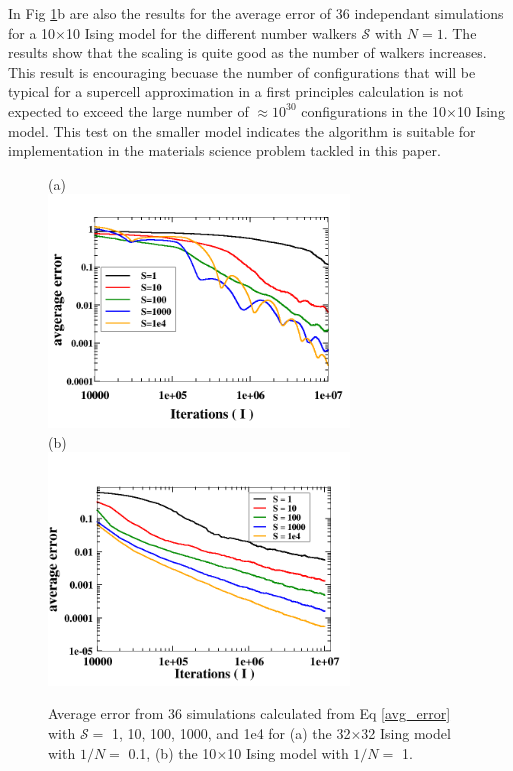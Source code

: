 \documentclass[aps,prl,reprint,superscriptaddress,showkeys]{revtex4-1}
\begin{document}
In Fig \ref{thirtytwo_Stest}b are also the results for the average error of 36 independant simulations for a 10$\times$10 Ising model for the different number walkers $\mathcal{S}$ with $N=1$. The results show that the scaling is quite good as the number of walkers increases. This result is encouraging becuase the number of configurations that will be typical for a supercell approximation in a first principles calculation is not expected to exceed the large number of $\approx 10^{30}$ configurations in the 10$\times$10 Ising model.  This test on the smaller model indicates the algorithm  is suitable for implementation in the materials science problem tackled in this paper. 
\begin{figure}[h!]
(a)\\
\includegraphics[width=8cm]{./figures/thirtytwo_root0_1_varyS.png}\\
(b)\\
\includegraphics[width=8cm]{./figures/10X10_root1_varyS.png}
\caption{ Average error from 36 simulations calculated from Eq \ref{avg_error} with $\mathcal{S}=$ 1, 10, 100, 1000, and 1e4 for  (a) the 32$\times$32 Ising model with $1/N=$ 0.1, (b) the 10$\times$10 Ising model with $1/N =$ 1. \label{thirtytwo_Stest} }
\end{figure}
\end{document}
